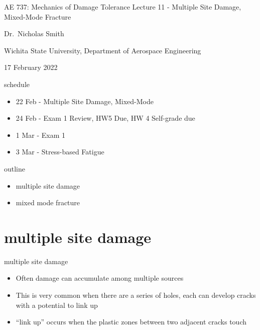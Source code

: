 \documentclass[
  letterpaper,
  ignorenonframetext,
  aspectratio=43,
  handout,
  12pt]{beamer}
\author{}
\date{}
\providecommand{\tightlist}{%
  \setlength{\itemsep}{0pt}\setlength{\parskip}{0pt}}
\providecommand{\tightlist}{%
\setlength{\itemsep}{0pt}\setlength{\parskip}{0pt}}
\begin{document}
\begin{frame}{AE 737: Mechanics of Damage Tolerance}
\protect\hypertarget{ae-737-mechanics-of-damage-tolerance}{}
Lecture 11 - Multiple Site Damage, Mixed-Mode Fracture

Dr.~Nicholas Smith

Wichita State University, Department of Aerospace Engineering

17 February 2022
\end{frame}

\begin{frame}{schedule}
\protect\hypertarget{schedule}{}
\begin{itemize}
\tightlist
\item
  22 Feb - Multiple Site Damage, Mixed-Mode
\item
  24 Feb - Exam 1 Review, HW5 Due, HW 4 Self-grade due
\item
  1 Mar - Exam 1
\item
  3 Mar - Stress-based Fatigue
\end{itemize}
\end{frame}

\begin{frame}{outline}
\protect\hypertarget{outline}{}
\begin{itemize}
\tightlist
\item
  multiple site damage
\item
  mixed mode fracture
\end{itemize}
\end{frame}

\hypertarget{multiple-site-damage}{%
\section{multiple site damage}\label{multiple-site-damage}}

\begin{frame}{multiple site damage}
\protect\hypertarget{multiple-site-damage-1}{}
\begin{itemize}
\tightlist
\item
  Often damage can accumulate among multiple sources
\item
  This is very common when there are a series of holes, each can develop
  cracks with a potential to link up
\item
  ``link up'' occurs when the plastic zones between two adjacent cracks
  touch
\end{itemize}
\end{frame}
\end{document}
